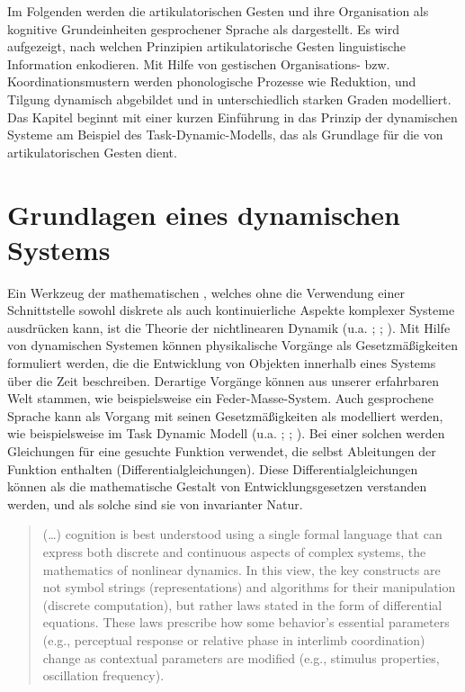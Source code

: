 Im Folgenden werden die artikulatorischen Gesten und ihre Organisation als kognitive Grundeinheiten gesprochener Sprache als  dargestellt. Es wird aufgezeigt, nach welchen Prinzipien artikulatorische Gesten linguistische Information enkodieren. Mit Hilfe von gestischen Organisations- bzw. Koordinationsmustern werden phonologische Prozesse wie Reduktion,  und Tilgung dynamisch abgebildet und in unterschiedlich starken Graden modelliert. Das Kapitel beginnt mit einer kurzen Einführung in das Prinzip der dynamischen Systeme am Beispiel des Task-Dynamic-Modells, das als Grundlage für die  von artikulatorischen Gesten dient. 

\section{Grundlagen eines dynamischen Systems}
\label{sec:0101}

Ein Werkzeug der mathematischen , welches ohne die Verwendung einer Schnittstelle sowohl diskrete als auch kontinuierliche Aspekte komplexer Systeme ausdrücken kann, ist die Theorie der nichtlinearen Dynamik (u.a. \citealt{Kelso1995}; \citealt{Kugler1987}; \citealt{Gafos2006}). Mit Hilfe von dynamischen Systemen können physikalische Vorgänge als Gesetzmäßigkeiten formuliert werden, die die Entwicklung von Objekten innerhalb eines Systems über die Zeit beschreiben. Derartige Vorgänge können aus unserer erfahrbaren Welt stammen, wie beispielsweise ein Feder-Masse-System. Auch gesprochene Sprache kann als Vorgang mit seinen Gesetzmäßigkeiten als  modelliert werden, wie beispielsweise im Task Dynamic Modell (u.a. \citealt{Fowler1980}; \citealt{Saltzman1989}; \citealt{Browman1986}). Bei einer solchen  werden Gleichungen für eine gesuchte Funktion verwendet, die selbst Ableitungen der Funktion enthalten (Differentialgleichungen). Diese Differentialgleichungen können als die mathematische Gestalt von Entwicklungsgesetzen verstanden werden, und als solche sind sie von invarianter Natur. 

\begin{quotation}
	(\dots{}) cognition is best understood using a single formal language that can express both discrete and continuous aspects of complex systems, the mathematics of nonlinear dynamics. In this view, the key constructs are not symbol strings (representations) and algorithms for their manipulation (discrete computation), but rather laws stated in the form of differential equations. These laws prescribe how some behavior’s essential parameters (e.g., perceptual response or relative phase in interlimb coordination) change as contextual parameters are modified (e.g., stimulus properties, oscillation frequency). \citep[][906]{Gafos2006}
\end{quotation}

